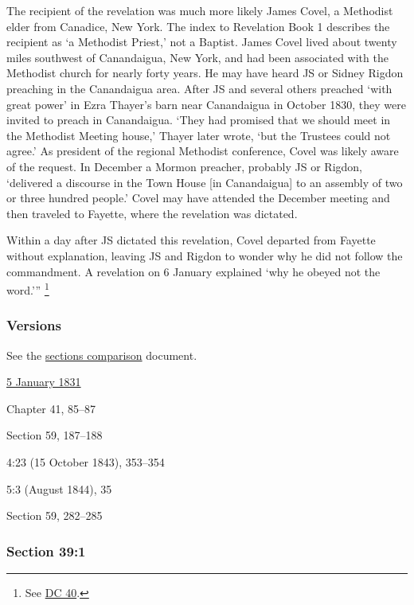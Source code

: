 			The recipient of the revelation was much more likely James Covel, a Methodist elder from Canadice, New York. The index to Revelation Book 1 describes the recipient as `a Methodist Priest,' not a Baptist. James Covel lived about twenty miles southwest of Canandaigua, New York, and had been associated with the Methodist church for nearly forty years. He may have heard JS or Sidney Rigdon preaching in the Canandaigua area. After JS and several others preached `with great power' in Ezra Thayer's barn near Canandaigua in October 1830, they were invited to preach in Canandaigua. `They had promised that we should meet in the Methodist Meeting house,' Thayer later wrote, `but the Trustees could not agree.' As president of the regional Methodist conference, Covel was likely aware of the request. In December a Mormon preacher, probably JS or Rigdon, `delivered a discourse in the Town House [in Canandaigua] to an assembly of two or three hundred people.' Covel may have attended the December meeting and then traveled to Fayette, where the revelation was dictated.
			
			Within a day after JS dictated this revelation, Covel departed from Fayette without explanation, leaving JS and Rigdon to wonder why he did not follow the commandment. A revelation on 6 January explained `why he obeyed not the word.'''%
				\footnote{%
					See \hyperref[DC40]{DC 40}.
					}
			
	\subsubsection{Versions}
		\label{DC39-V}
		
		See the \href{https://drive.google.com/file/d/1goAvNz8jS4R8slYfMG_db55Ty2z_vmgK/view?usp=sharing}{sections comparison} document.
	
		\begin{compactdesc}
			\item[JSP] \hyperref[EMS-1831-JS-5-JAN-1831]{5 January 1831}
			\item[BC] Chapter 41, 85--87
			\item[DC 1835] Section 59, 187--188
			\item[TS] 4:23 (15 October 1843), 353--354
			\item[MS] 5:3 (August 1844), 35
			\item[DC 1844] Section 59, 282--285
		\end{compactdesc}

	\subsubsection{Section 39:1} %
		\label{DC39-1}

